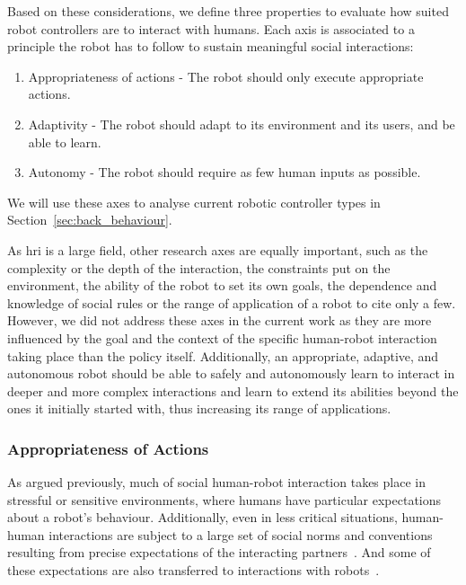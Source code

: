 Based on these considerations, we define three properties to evaluate how suited robot controllers are to interact with humans. Each axis is associated to a principle the robot has to follow to sustain meaningful social interactions:
\begin{enumerate}
   	\item Appropriateness of actions - The robot should only execute appropriate actions.
   	\item Adaptivity - The robot should adapt to its environment and its users, and be able to learn.
   	\item Autonomy - The robot should require as few human inputs as possible.
\end{enumerate}
We will use these axes to analyse current robotic controller types in Section~\ref{sec:back_behaviour}.    

As \gls{hri} is a large field, other research axes are equally important, such as the complexity or the depth of the interaction, the constraints put on the environment, the ability of the robot to set its own goals, the dependence and knowledge of social rules or the range of application of a robot to cite only a few. However, we did not address these axes in the current work as they are more influenced by the goal and the context of the specific human-robot interaction taking place than the policy itself. Additionally, an appropriate, adaptive, and autonomous robot should be able to safely and autonomously learn to interact in deeper and more complex interactions and learn to extend its abilities beyond the ones it initially started with, thus increasing its range of applications.

\subsubsection{Appropriateness of Actions} \label{ssec:appropriateness} 

As argued previously, much of social human-robot interaction takes place in  stressful or sensitive environments, where humans have particular expectations about a robot's behaviour. Additionally, even in less critical situations, human-human interactions are subject to a large set of social norms and conventions resulting from precise expectations of the interacting partners~\citep{sherif1936psychology}. And some of these expectations are also transferred to interactions with robots~\citep{bartneck2004design}.

